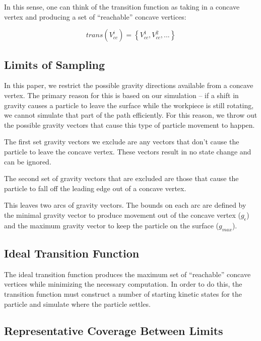In this sense, one can think of the transition function as taking in a concave vertex and producing a set of ``reachable'' concave vertices:

$$
trans(V_{cc}^{i}) = \left \{ V_{cc}^{1}, V_{cc}^{2}, ...  \right \}
$$

	\subsection{Limits of Sampling}

In this paper, we restrict the possible gravity directions available from a concave vertex. The primary reason for this is based on our simulation -- if a shift in gravity causes a particle to leave the surface while the workpiece is still rotating, we cannot simulate that part of the path efficiently. For this reason, we throw out the possible gravity vectors that cause this type of particle movement to happen.

The first set gravity vectors we exclude are any vectors that don't cause the particle to leave the concave vertex. These vectors result in no state change and can be ignored.

The second set of gravity vectors that are excluded are those that cause the particle to fall off the leading edge out of a concave vertex.


This leaves two arcs of gravity vectors. The bounds on each arc are defined by the minimal gravity vector to produce movement out of the concave vertex ($g_{\epsilon}$) and the maximum gravity vector to keep the particle on the surface ($g_{max}$).

	\subsection{Ideal Transition Function}

The ideal transition function produces the maximum set of ``reachable'' concave vertices while minimizing the necessary computation. In order to do this, the transition function must construct a number of starting kinetic states for the particle and simulate where the particle settles.

	\subsection{Representative Coverage Between Limits}

